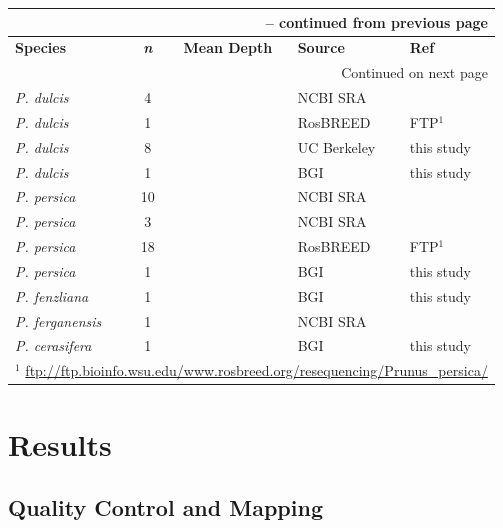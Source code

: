 \documentclass[12pt]{article}
\begin{document}
\begin{center}
\begin{longtable}{lccll}
\multicolumn{5}{r}{{\bfseries \tablename\ \thetable{} -- continued from previous page}} \\
\hline
\multicolumn{1}{l}{\textbf{Species}} &
\multicolumn{1}{c}{\textbf{\emph{n}}} &
\multicolumn{1}{c}{\textbf{Mean Depth}} &
\multicolumn{1}{l}{\textbf{Source}} &
\multicolumn{1}{l}{\textbf{Ref}} \\
\hline 
\endhead
%
\hline
\multicolumn{5}{r}{{Continued on next page}} \\
\hline \hline
\endfoot
%
\endlastfoot
%
	\emph{P. dulcis} &4 & &NCBI SRA &\citealt{koepke2013comparative}\\
	\emph{P. dulcis} &1 & &RosBREED &FTP$^{1}$\\
	\emph{P. dulcis} &8 & &UC Berkeley &this study \\
	\emph{P. dulcis} &1 & &BGI &this study\\
	\emph{P. persica} &10 & &NCBI SRA &\citealt{verde2013high} \\
	\emph{P. persica} &3 & &NCBI SRA &\citealt{ahmad2011whole} \\
	\emph{P. persica} &18 & &RosBREED &FTP$^{1}$ \\
	\emph{P. persica} &1 & &BGI &this study \\
	\emph{P. fenzliana} &1 & &BGI &this study\\
	\emph{P. ferganensis} &1 & &NCBI SRA &\citealt{verde2013high}\\
	\emph{P. cerasifera} &1 & &BGI &this study\\ \hline \hline
	\multicolumn{5}{l}{$^{1}$ \url{ftp://ftp.bioinfo.wsu.edu/www.rosbreed.org/resequencing/Prunus_persica/}}\\
\end{longtable}
\end{center}
%
%
\section*{Results}
\subsection*{Quality Control and Mapping}
\end{document}
